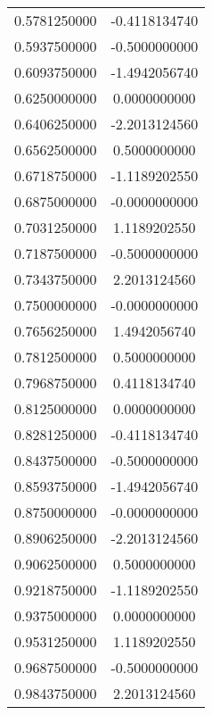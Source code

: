 \begin{longtable}[c]{cc}
0.5781250000 & -0.4118134740 \\
0.5937500000 & -0.5000000000 \\
0.6093750000 & -1.4942056740 \\
0.6250000000 & 0.0000000000 \\
0.6406250000 & -2.2013124560 \\
0.6562500000 & 0.5000000000 \\
0.6718750000 & -1.1189202550 \\
0.6875000000 & -0.0000000000 \\
0.7031250000 & 1.1189202550 \\
0.7187500000 & -0.5000000000 \\
0.7343750000 & 2.2013124560 \\
0.7500000000 & -0.0000000000 \\
0.7656250000 & 1.4942056740 \\
0.7812500000 & 0.5000000000 \\
0.7968750000 & 0.4118134740 \\
0.8125000000 & 0.0000000000 \\
0.8281250000 & -0.4118134740 \\
0.8437500000 & -0.5000000000 \\
0.8593750000 & -1.4942056740 \\
0.8750000000 & -0.0000000000 \\
0.8906250000 & -2.2013124560 \\
0.9062500000 & 0.5000000000 \\
0.9218750000 & -1.1189202550 \\
0.9375000000 & 0.0000000000 \\
0.9531250000 & 1.1189202550 \\
0.9687500000 & -0.5000000000 \\
0.9843750000 & 2.2013124560 \\  
\end{longtable}

